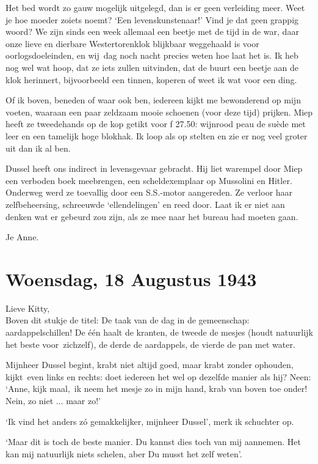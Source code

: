 \documentclass{book}
\begin{document}
Het bed wordt zo gauw mogelijk uitgelegd, dan is er geen verleiding meer. Weet
je hoe moeder zoiets noemt? `Een levenskunstenaar!' Vind je dat geen grappig
woord? We zijn sinds een week allemaal een beetje met de tijd in de war, daar
onze lieve en dierbare Westertorenklok blijkbaar weggehaald is voor
oorlogsdoeleinden, en wij~dag noch nacht precies weten hoe laat het is. Ik heb
nog wel wat hoop, dat ze iets zullen uitvinden, dat de buurt een beetje aan de
klok herinnert, bijvoorbeeld een tinnen, koperen of weet ik wat voor een ding.

Of ik boven, beneden of waar ook ben, iedereen kijkt me bewonderend op mijn
voeten, waaraan een paar zeldzaam mooie schoenen (voor deze tijd) prijken. Miep
heeft ze tweedehands op de kop getikt voor ƒ 27.50: wijnrood peau de suède met
leer en een tamelijk hoge blokhak. Ik loop als op stelten en zie er nog veel
groter uit dan ik al ben.

Dussel heeft ons indirect in levensgevaar gebracht. Hij liet warempel door Miep
een verboden boek meebrengen, een scheldexemplaar op Mussolini en Hitler.
Onderweg werd ze toevallig door een S.S.-motor aangereden. Ze verloor haar
zelfbeheersing, schreeuwde `ellendelingen' en reed door.  Laat ik er niet aan
denken wat er gebeurd zou zijn, als ze mee naar het bureau had moeten gaan.

Je Anne.

\section*{Woensdag, 18 Augustus 1943}

Lieve Kitty,\\
Boven dit stukje de titel: De taak van de dag in de gemeenschap:
aardappelschillen! De één haalt de kranten, de tweede de mesjes (houdt
natuurlijk het beste voor~zichzelf), de derde de aardappels, de vierde de pan
met water.

Mijnheer Dussel begint, krabt niet altijd goed, maar krabt zonder ophouden,
kijkt~even links en rechts: doet iedereen het wel op dezelfde manier als hij?
Neen: `Anne, kijk maal,~ik neem het mesje zo in mijn hand, krab van boven toe
onder! Nein, zo niet ... maar zo!'

`Ik vind het anders zó gemakkelijker, mijnheer Dussel', merk ik schuchter op.

`Maar dit is toch de beste manier. Du kannst dies toch van mij aannemen.  Het
kan mij natuurlijk niets schelen, aber Du musst het zelf weten'.
\end{document}
